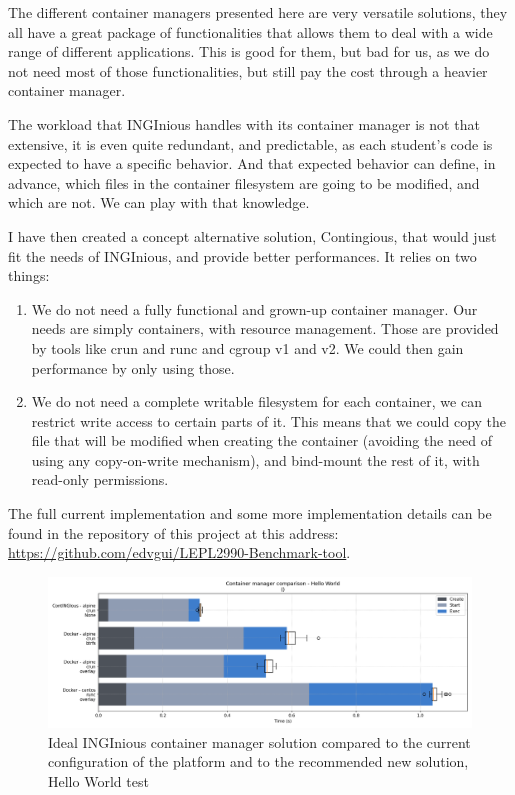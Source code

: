 The different container managers presented here are very versatile solutions, they all have a great package of functionalities that allows them to deal with a wide range of different applications.  This is good for them, but bad for us, as we do not need most of those functionalities, but still pay the cost through a heavier container manager.

The workload that INGInious handles with its container manager is not that extensive, it is even quite redundant, and predictable, as each student's code is expected to have a specific behavior.  And that expected behavior can define, in advance, which files in the container filesystem are going to be modified, and which are not.  We can play with that knowledge.

I have then created a concept alternative solution, Contingious, that would just fit the needs of INGInious, and provide better performances.  It relies on two things:
\begin{enumerate}
  \item We do not need a fully functional and grown-up container manager. Our needs are simply containers, with resource management.  Those are provided by tools like crun and runc and cgroup v1 and v2.  We could then gain performance by only using those.
  \item We do not need a complete writable filesystem for each container, we can restrict write access to certain parts of it.  This means that we could copy the file that will be modified when creating the container (avoiding the need of using any copy-on-write mechanism), and bind-mount the rest of it, with read-only permissions.
\end{enumerate}

The full current implementation and some more implementation details can be found in the repository of this project at this address: \href{https://github.com/edvgui/LEPL2990-Benchmark-tool}{https://github.com/edvgui/LEPL2990-Benchmark-tool}.

\begin{figure}[h!]
  \begin{center}
    \includegraphics[width=\linewidth]{images/question-2-hello-world.png}
    \caption{Ideal INGInious container manager solution compared to the current configuration of the platform and to the recommended new solution, Hello World test}
    \label{fig:q2:hello-world}
  \end{center}
\end{figure}

